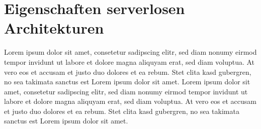 \section{Eigenschaften serverlosen Architekturen}
Lorem ipsum dolor sit amet, consetetur sadipscing elitr,
sed diam nonumy eirmod tempor invidunt ut labore et dolore magna
aliquyam erat, sed diam voluptua.
At vero eos et accusam et justo duo dolores et ea rebum. Stet clita kasd gubergren,
no sea takimata sanctus est Lorem ipsum dolor sit amet. Lorem ipsum dolor sit amet,
consetetur sadipscing elitr, sed diam nonumy eirmod tempor invidunt ut labore et
dolore magna aliquyam erat, sed diam voluptua.
At vero eos et accusam et justo duo dolores et ea rebum.
Stet clita kasd gubergren, no sea takimata sanctus est Lorem ipsum dolor sit amet.